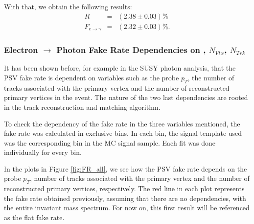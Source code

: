 With that, we obtain the following results:
\begin{eqnarray}
R &=& \left( 2.38 \pm 0.03 \right)\% \\
F_{e\rightarrow \gamma} &=& \left( 2.32\pm 0.03 \right)\%.
\end{eqnarray}

\subsubsection{Electron $\rightarrow$ Photon Fake Rate Dependencies on \pt, $N_{Vtx}$, $N_{Trk}$}

It has been shown before, for example in the SUSY photon analysis, that the PSV fake rate is dependent on variables such as the probe $p_T$, the number of tracks associated with the primary vertex and the number of reconstructed primary vertices in the event. The nature of the two last dependencies are rooted in the track reconstruction and matching algorithm. 

To check the dependency of the fake rate in the three variables mentioned, the fake rate was calculated in exclusive bins. In each bin, the signal template used was the corresponding bin in the MC signal sample. Each fit was done individually for every bin.

In the plots in Figure \ref{fig:FR_all}, we see how the PSV fake rate depends on the probe $p_T$, number of tracks associated with the primary vertex and the number of reconstructed primary vertices, respectively. The red line in each plot represents the fake rate obtained previously, assuming that there are no dependencies, with the entire invariant mass spectrum. For now on, this first result will be referenced as the flat fake rate.


